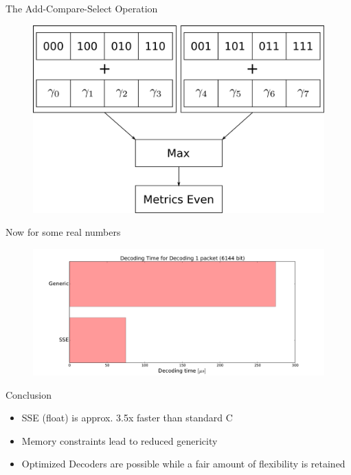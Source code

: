 \documentclass[18pt]{beamer}
\begin{document}
\begin{frame}{The Add-Compare-Select Operation}

\begin{figure}[ht]
  \centering
  \includegraphics[scale=0.15]{logos/ACS.pdf}
\end{figure}

\end{frame}

\begin{frame}{Now for some real numbers}
\begin{figure}[]
  \includegraphics[scale=0.35]{logos/sse_vs_gen.pdf}
\end{figure}

\end{frame}

\begin{frame}{Conclusion}
\begin{itemize}
	\item SSE (float) is approx. 3.5x faster than standard C
	\item Memory constraints lead to reduced genericity
	\item Optimized Decoders are possible while a fair amount of flexibility is retained
	
\end{itemize}
\end{frame}
\end{document}
